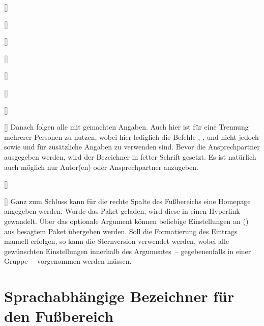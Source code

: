 \begin{Bundle*}{}
\begin{Declaration}{[]}
\begin{Declaration}{[]}
\begin{Declaration}{[]}
\begin{Declaration}{[]}
\begin{Declaration}{[]}
\begin{Declaration}{[]}
\begin{Declaration}{[]}
\begin{Declaration}{[]}
Danach folgen alle mit  gemachten Angaben. Auch hier ist 
 für eine Trennung mehrerer Personen zu nutzen, wobei hier lediglich 
die Befehle , ,  und 
 nicht jedoch  sowie  und 
 für zusätzliche Angaben zu verwenden sind. Bevor die 
Ansprechpartner ausgegeben werden, wird der Bezeichner  
in fetter Schrift gesetzt. Es ist natürlich auch möglich nur Autor(en) oder 
Ansprechpartner anzugeben.
\end{Declaration}
\end{Declaration}
\end{Declaration}
\end{Declaration}
\end{Declaration}
\end{Declaration}
\end{Declaration}
\end{Declaration}

\begin{Declaration}{[]}
\begin{Declaration}{[]}
\printdeclarationlist%
%
Ganz zum Schluss kann für die rechte Spalte des Fußbereichs eine Homepage 
angegeben werden. Wurde das Paket  geladen, wird diese in 
einen Hyperlink gewandelt. Über das optionale Argument können beliebige 
Einstellungen an () aus besagtem Paket 
übergeben werden. Soll die Formatierung des Eintrags manuell erfolgen, so kann 
die Sternversion  verwendet werden, wobei alle gewünschten 
Einstellungen innerhalb des Argumentes~-- gegebenenfalls in einer Gruppe~-- 
vorgenommen werden müssen.
\end{Declaration}
\end{Declaration}



\section{Sprachabhängige Bezeichner für den Fußbereich}


\end{Bundle*}
